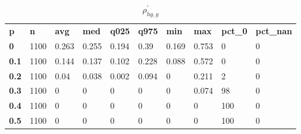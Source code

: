 \begin{table}[h]
 \centering 
\footnotesize
\caption{$\rho_{hg,g}^\prime $}
\label{tab:alphahgg}
\begin{tabular}[h]{| l l l l l l l l l l|
    } \hline
\textbf{ p} & \textbf{ n} & \textbf{ avg} & \textbf{ med} & \textbf{ q025} & \textbf{ q975} & \textbf{ min} & \textbf{ max} & \textbf{ pct\_0} & \textbf{ pct\_nan}
           \\
  \textbf{  0} & 1100 & 0.263 & 0.255 & 0.194 &  0.39 & 0.169 & 0.753 &   0 & 0
           \\
  \textbf{0.1} & 1100 & 0.144 & 0.137 & 0.102 & 0.228 & 0.088 & 0.572 &   0 & 0
           \\
  \textbf{0.2} & 1100 &  0.04 & 0.038 & 0.002 & 0.094 &     0 & 0.211 &   2 & 0
           \\
  \textbf{0.3} & 1100 &     0 &     0 &     0 &     0 &     0 & 0.074 &  98 & 0
           \\
  \textbf{0.4} & 1100 &     0 &     0 &     0 &     0 &     0 &     0 & 100 & 0
           \\
  \textbf{0.5} & 1100 &     0 &     0 &     0 &     0 &     0 &     0 & 100 & 0
           \\
 \hline \end{tabular}
 \end{table}
